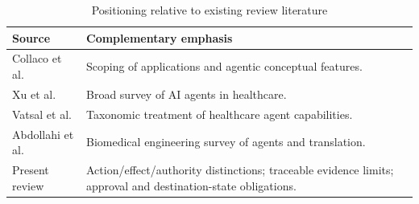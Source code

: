 \begin{table}[t]
\caption{Positioning relative to existing review literature}
\label{tab:position}\centering\footnotesize
\begin{tabularx}{\columnwidth}{@{}p{}Y@{}}\toprule
Source & Complementary emphasis \\ \midrule
Collaco et al. \cite{collaco2026review} & Scoping of applications and agentic conceptual features.\\
Xu et al. \cite{xu2026survey} & Broad survey of AI agents in healthcare.\\
Vatsal et al. \cite{vatsal2026taxonomy} & Taxonomic treatment of healthcare agent capabilities.\\
Abdollahi et al. \cite{hu2026survey} & Biomedical engineering survey of agents and translation.\\
Present review & Action/effect/authority distinctions; traceable evidence limits; approval and destination-state obligations.\\ \bottomrule
\end{tabularx}
\end{table}

